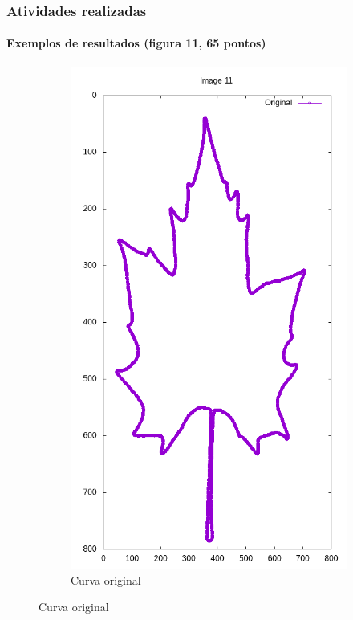 \begin{frame}
	\frametitle{Atividades realizadas}
	\framesubtitle{Exemplos de resultados (figura 11, 65 pontos)}
	
	\begin{figure}[ht!]
		\centering
		\begin{subfigure}[t]{0.24\textwidth}
			\centering
			\includegraphics[width=\textwidth]{img/rec/11ori.png}
			\caption{Curva original}
		\end{subfigure}

\end{figure}
\end{frame}

